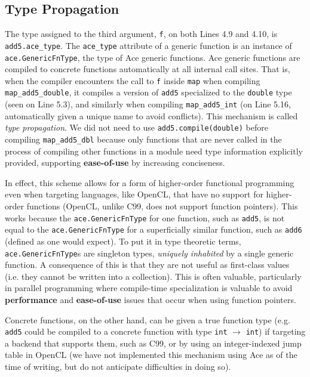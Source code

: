 \documentclass[9pt,preprint]{sigplanconf}
\begin{document}
\subsection{Type Propagation}
The type assigned to the third argument, \verb|f|, on both Lines 4.9 and 4.10, is \verb|add5.ace_type|. The \verb|ace_type| attribute of a generic function is an instance of \verb|ace.GenericFnType|, the type of Ace generic functions. Ace generic functions are compiled to concrete functions automatically at all internal call sites. That is, when the compiler encounters the call to \verb|f| inside \verb|map| when compiling \verb|map_add5_double|, it compiles a version of \verb|add5| specialized to the \verb|double| type (seen on Line 5.3), and similarly when compiling \verb|map_add5_int| (on Line 5.16, automatically given a unique name to avoid conflicts). This mechanism is called {\em type propagation}. We did not need to use \verb|add5.compile(double)| before compiling \verb|map_add5_dbl| because only functions that are never called in the process of compiling other functions in a module need type information explicitly provided, supporting \textbf{ease-of-use} by increasing conciseness.

In effect, this scheme allows for a form of higher-order functional programming even when targeting languages, like OpenCL, that have no support for higher-order functions (OpenCL, unlike C99, does not support function pointers). This works because the \verb|ace.GenericFnType| for one function, such as \verb|add5|, is not equal to  the \verb|ace.GenericFnType| for a superficially similar function, such as \verb|add6| (defined as one would expect). To put it in type theoretic terms, \verb|ace.GenericFnType|s are singleton types, {\em uniquely inhabited} by a single generic function. A consequence of this is that they are not useful as first-class values (i.e. they cannot be written into a collection). This is often valuable, particularly in parallel programming where compile-time specialization is valuable to avoid \textbf{performance} and \textbf{ease-of-use} issues that occur when using function pointers.

Concrete functions, on the other hand, can be given a true function type (e.g. \verb|add5| could be compiled to a concrete function with type \verb|int| $\rightarrow$ \verb|int|) if targeting a backend that supports them, such as C99, or by using an integer-indexed jump table in OpenCL (we have not implemented this mechanism using Ace as of the time of writing, but do not anticipate difficulties in doing so).
\end{document}

